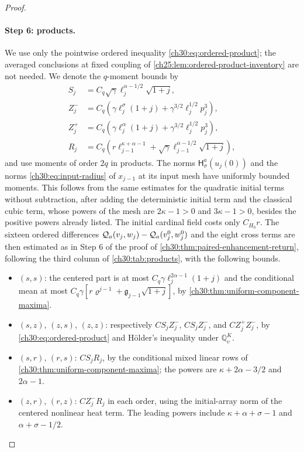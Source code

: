 \begin{proof}
\paragraph{Step 6: products.} We use only the pointwise ordered inequality \eqref{ch30:eq:ordered-product}; the averaged conclusions at fixed coupling of \cref{ch25:lem:ordered-product-inventory} are not needed. We denote the $q$-moment bounds by
\[
 \begin{split}
 S_j&=C_q\sqrt\gamma\ell_j^{\alpha-1/2}\sqrt{1+j},\\
 Z_j^-&=C_q(\gamma\ell_j^\sigma(1+j)+\gamma^{3/2}\ell_j^{1/2}p_j^3),\\
 Z_j^+&=C_q(\gamma\ell_j^\alpha(1+j)+\gamma^{3/2}\ell_j^{1/2}p_j^3),\\
 R_j&=C_q(r\ell_{j-1}^{\kappa+\alpha-1}+\sqrt\gamma\ell_{j-1}^{\alpha-1/2}\sqrt{1+j}),
 \end{split}
\]
and use moments of order $2q$ in products. The norms $\mathsf H_\sigma^a(u_j(0))$ and the norms \eqref{ch30:eq:input-radius} of $x_{j-1}$ at its input mesh have uniformly bounded moments. This follows from the same estimates for the quadratic initial terms without subtraction, after adding the deterministic initial term and the classical cubic term, whose powers of the mesh are $2\kappa-1>0$ and $3\kappa-1>0$, besides the positive powers already listed. The initial cardinal field costs only $C_{H_0}r$. The sixteen ordered differences $\mathcal Q_{a}(v_j,w_j)-\mathcal Q_{a}(v_j^0,w_j^0)$ and the eight cross terms are then estimated as in Step 6 of the proof of \cref{ch30:thm:paired-enhancement-return}, following the third column of \cref{ch30:tab:products}, with the following bounds.
\begin{itemize}
\item $(s,s)$: the centered part is at most $C_q\gamma\ell_j^{2\alpha-1}(1+j)$ and the conditional mean at most $C_q\gamma[r\varrho^{j-1}+\mathfrak g_{j-1}\sqrt{1+j}]$, by \cref{ch30:thm:uniform-component-maxima}.
\item $(s,z)$, $(z,s)$, $(z,z)$: respectively $CS_jZ_j^-$, $CS_jZ_j^-$, and $CZ_j^+Z_j^-$, by \eqref{ch30:eq:ordered-product} and H\"older's inequality under $\mathbb Q_v^K$.
\item $(s,r)$, $(r,s)$: $CS_jR_j$, by the conditional mixed linear rows of \cref{ch30:thm:uniform-component-maxima}; the powers are $\kappa+2\alpha-3/2$ and $2\alpha-1$.
\item $(z,r)$, $(r,z)$: $CZ_j^-R_j$ in each order, using the initial-array norm of the centered nonlinear heat term. The leading powers include $\kappa+\alpha+\sigma-1$ and $\alpha+\sigma-1/2$.

\end{itemize}
\end{proof}
